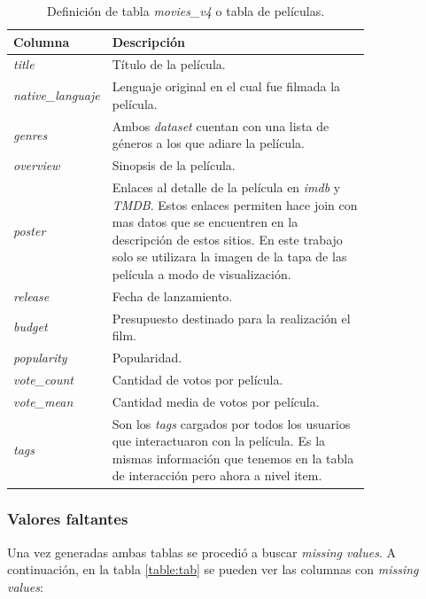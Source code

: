 \documentclass[11pt,a4paper,twoside]{thesis}
\begin{document}
\begin{table}[!htb]
	\centering
	\footnotesize
	\begin{tabular}{l | p{0.8\linewidth}}
	\hline
		Columna       & Descripción \\
	\hline

	\textit{title}             	& Título de la película. \\
	\textit{native\_languaje} 	& Lenguaje original en el cual fue filmada la película. \\
	\textit{genres}				& Ambos \textit{dataset} cuentan con una lista de géneros a los que adiare la película. \\
	\textit{overview}			& Sinopsis de la película. \\
	\textit{poster} 			& Enlaces al detalle de la película en \textit{imdb} y \textit{TMDB}. Estos enlaces
									permiten hace join con mas datos que se encuentren en la descripción de estos
			 						sitios. En este trabajo solo se utilizara la imagen de la tapa de las película
									a modo de visualización. \\
	\textit{release}  			& Fecha de lanzamiento. \\
	\textit{budget}  			& Presupuesto destinado para la realización el film. \\
	\textit{popularity}  		& Popularidad. \\
	\textit{vote\_count}  		& Cantidad de votos por película. \\
	\textit{vote\_mean}  		& Cantidad media de votos por película. \\
	\textit{tags}  				& Son los \textit{tags} cargados por todos los usuarios que interactuaron con la película. 
									Es la mismas información que tenemos en la tabla de interacción pero ahora a nivel item. \\

	\hline
	\end{tabular}
	\caption{
		Definición de tabla \textit{movies\_v4} o tabla de películas.
	}
	\label{table:moviesTableDef}
\end{table}



\subsubsection*{Valores faltantes}

Una vez generadas ambas tablas se procedió a buscar \textit{missing values}. A continuación, en la tabla \ref{table:tab} 
se pueden ver las columnas con \textit{missing values}:
\end{document}
